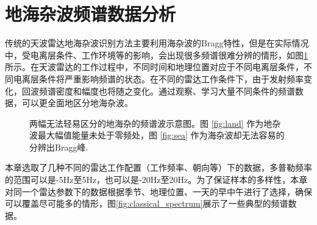 \section{地海杂波频谱数据分析}
\label{sec:othr_data}
传统的天波雷达地海杂波识别方法主要利用海杂波的Bragg特性，但是在实际情况中，受电离层条件、工作环境等的影响，会出现很多频谱很难分辨的情形，如图\ref{fig:spectrum}所示。在天波雷达的工作过程中，不同时间和地理位置对应于不同电离层条件，不同电离层条件将严重影响频谱的状态。在不同的雷达工作条件下，由于发射频率变化，回波频谱密度和幅度也将随之变化。通过观察、学习大量不同条件的频谱数据，可以更全面地区分地海杂波。
\begin{figure}[H]
	\centering
	\hfil
	\caption{两幅无法轻易区分的地海杂的频谱波示意图。图 \ref{fig:land} 作为地杂波最大幅值能量未处于零频处，图 \ref{fig:sea} 作为海杂波却无法容易的分辨出Bragg峰.}
	\label{fig:spectrum}
\end{figure}
本章选取了几种不同的雷达工作配置（工作频率、朝向等）下的数据，多普勒频率的范围可以是-5Hz至5Hz，也可以是-20Hz至20Hz。为了保证样本的多样性，本章对同一个雷达参数下的数据根据季节、地理位置、一天的早中午进行了选择，确保可以覆盖尽可能多的情形，图\ref{fig:classical_spectrum}展示了一些典型的频谱数据。
